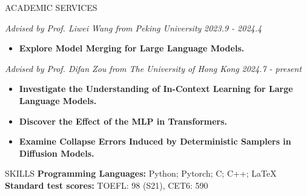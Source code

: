 \documentclass{resume} %
\begin{document}
\begin{rSection}{ACADEMIC SERVICES}

\textit{Advised by Prof. Liwei Wang from Peking University} \hfill \textit{2023.9 - 2024.4} \\
\begin{itemize}
    \item \textbf{Explore Model Merging for Large Language Models.}

\end{itemize}

\textit{Advised by Prof. Difan Zou from The University of Hong Kong} \hfill \textit{2024.7 - present} \\
\begin{itemize}
    \item \textbf{Investigate the Understanding of In-Context Learning for Large Language Models.}
    \item \textbf{Discover the Effect of the MLP in Transformers.}
    \item \textbf{Examine Collapse Errors Induced by Deterministic Samplers in Diffusion Models.}
\end{itemize}

\end{rSection}



\begin{rSection}{SKILLS}
\textbf{Programming Languages:} Python; Pytorch; C; C++; \LaTeX \\
\textbf{Standard test scores:}
TOEFL: 98 (S21), CET6: 590
\end{rSection}
\end{document}
